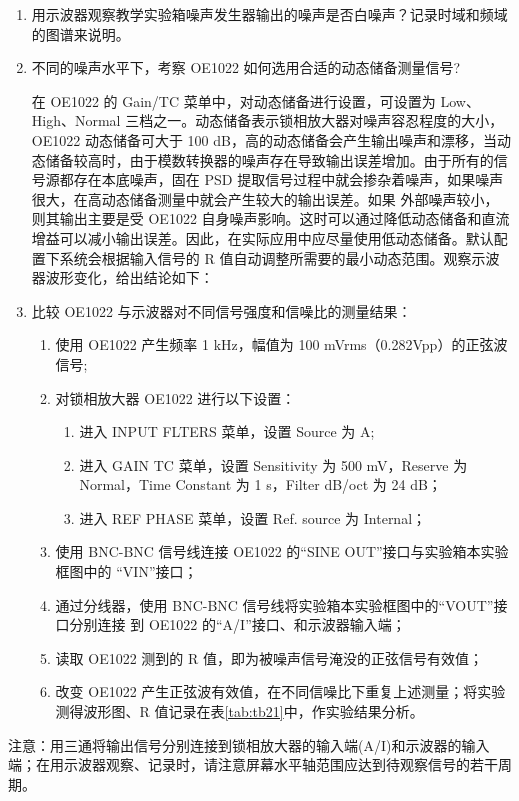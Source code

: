 \documentclass[11pt,a4paper]{ctexart}
\begin{document}
\begin{enumerate}
\item 用示波器观察教学实验箱噪声发生器输出的噪声是否白噪声？记录时域和频域的图谱来说明。
\item 不同的噪声水平下，考察 OE1022 如何选用合适的动态储备测量信号?
\par
在 OE1022 的 Gain/TC 菜单中，对动态储备进行设置，可设置为 Low、High、Normal 三档之一。动态储备表示锁相放大器对噪声容忍程度的大小，OE1022 动态储备可大于 100 dB，高的动态储备会产生输出噪声和漂移，当动态储备较高时，由于模数转换器的噪声存在导致输出误差增加。由于所有的信号源都存在本底噪声，固在 PSD 提取信号过程中就会掺杂着噪声，如果噪声很大，在高动态储备测量中就会产生较大的输出误差。如果 外部噪声较小，则其输出主要是受 OE1022 自身噪声影响。这时可以通过降低动态储备和直流增益可以减小输出误差。因此，在实际应用中应尽量使用低动态储备。默认配置下系统会根据输入信号的 R 值自动调整所需要的最小动态范围。观察示波器波形变化，给出结论如下：
\vspace{5cm}
\item 比较 OE1022 与示波器对不同信号强度和信噪比的测量结果：
\begin{enumerate}
\item 使用 OE1022 产生频率 1 kHz，幅值为 100 mVrms（0.282Vpp）的正弦波信号;
\item 对锁相放大器 OE1022 进行以下设置：
	\begin{enumerate}
	\item 进入 INPUT FLTERS 菜单，设置 Source 为 A;
	\item 进入 GAIN TC 菜单，设置 Sensitivity 为 500 mV，Reserve 为 Normal，Time Constant 为 1 s，Filter dB/oct 为 24 dB；
	\item 进入 REF PHASE 菜单，设置 Ref. source 为 Internal；
	\end{enumerate}
\item 使用 BNC-BNC 信号线连接 OE1022 的“SINE OUT”接口与实验箱本实验框图中的
“VIN”接口；
\item 通过分线器，使用 BNC-BNC 信号线将实验箱本实验框图中的“VOUT”接口分别连接
到 OE1022 的“A/I”接口、和示波器输入端；
\item 读取 OE1022 测到的 R 值，即为被噪声信号淹没的正弦信号有效值；
\item 改变 OE1022 产生正弦波有效值，在不同信噪比下重复上述测量；将实验测得波形图、R 值记录在表\cref{tab:tb21}中，作实验结果分析。
\end{enumerate}
\end{enumerate}
注意：用三通将输出信号分别连接到锁相放大器的输入端(A/I)和示波器的输入端；在用示波器观察、记录时，请注意屏幕水平轴范围应达到待观察信号的若干周期。
\end{document}
